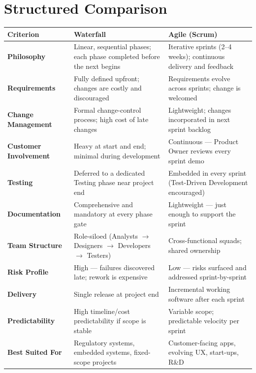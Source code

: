 \documentclass[12pt, a4paper]{report}
\begin{document}
\section{Structured Comparison}

\begin{longtable}{L{3cm} L{5.5cm} L{5.5cm}}
  \toprule
  \textbf{Criterion} & \textbf{Waterfall} & \textbf{Agile (Scrum)} \\
  \midrule
  \endhead
  \bottomrule
  \endfoot

  \textbf{Philosophy}
    & Linear, sequential phases; each phase completed before the next begins
    & Iterative sprints (2--4 weeks); continuous delivery and feedback \\[4pt]

  \textbf{Requirements}
    & Fully defined upfront; changes are costly and discouraged
    & Requirements evolve across sprints; change is welcomed \\[4pt]

  \textbf{Change Management}
    & Formal change-control process; high cost of late changes
    & Lightweight; changes incorporated in next sprint backlog \\[4pt]

  \textbf{Customer Involvement}
    & Heavy at start and end; minimal during development
    & Continuous --- Product Owner reviews every sprint demo \\[4pt]

  \textbf{Testing}
    & Deferred to a dedicated Testing phase near project end
    & Embedded in every sprint (Test-Driven Development encouraged) \\[4pt]

  \textbf{Documentation}
    & Comprehensive and mandatory at every phase gate
    & Lightweight --- just enough to support the sprint \\[4pt]

  \textbf{Team Structure}
    & Role-siloed (Analysts $\rightarrow$ Designers $\rightarrow$ Developers $\rightarrow$ Testers)
    & Cross-functional squads; shared ownership \\[4pt]

  \textbf{Risk Profile}
    & High --- failures discovered late; rework is expensive
    & Low --- risks surfaced and addressed sprint-by-sprint \\[4pt]

  \textbf{Delivery}
    & Single release at project end
    & Incremental working software after each sprint \\[4pt]

  \textbf{Predictability}
    & High timeline/cost predictability if scope is stable
    & Variable scope; predictable velocity per sprint \\[4pt]

  \textbf{Best Suited For}
    & Regulatory systems, embedded systems, fixed-scope projects
    & Customer-facing apps, evolving UX, start-ups, R\&D \\

\end{longtable}
\end{document}
